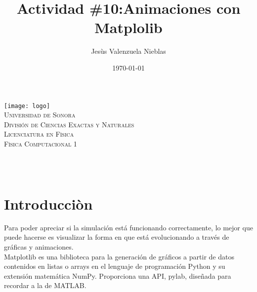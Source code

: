\documentclass[12pt]{article}
\title{Actividad \#10:Animaciones con Matplolib}
\author{\Large Jesùs Valenzuela Nieblas\\}
\date{\today}
\makeatletter
\let\thetitle\@title
\let\theauthor\@author
\makeatother
\begin{document}

\begin{titlepage}
	\centering
    \vspace*{.5cm}
     \texttt{[image: logo]}\\	%
    \textsc{\Large Universidad de Sonora}\\[1.0 cm]	%
	\textsc{\Large División de Ciencias Exactas y Naturales}\\[.50 cm]
  	\textsc{\Large Licenciatura en Fìsica}\\[.5 cm]
  \textsc{\large Fìsica Computacional 1}\\[1.5 cm]				%
	
	{ \huge \bfseries \thetitle}\\

    \vspace*{3 cm}
	\begin{minipage}{\textwidth}
    \centering
    \theauthor
	\end{minipage}\\[3 cm]
	
 
	\vfill
	
\end{titlepage}


\section{Introducciòn}
Para poder apreciar si la simulación está funcionando correctamente, lo mejor que puede hacerse es visualizar la forma en que está evolucionando a través de gráficas y animaciones.\\
Matplotlib es una biblioteca para la generación de gráficos a partir de datos contenidos en listas o arrays en el lenguaje de programación Python y su extensión matemática NumPy. Proporciona una API, pylab, diseñada para recordar a la de MATLAB.
\end{document}
